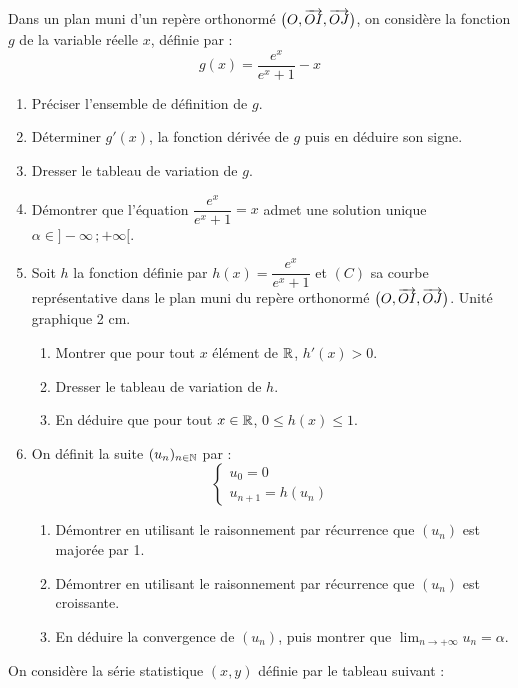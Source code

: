 \documentclass[11pt]{article}
\begin{document}

Dans un plan muni d'un repère orthonormé $\big(O,\overrightarrow{OI},\overrightarrow{OJ}\big)$, on considère la fonction $g$ de la variable réelle $x$, définie par :
\[ g(x) = \frac{e^x}{e^x + 1} - x \]

\begin{enumerate}
  \item Préciser l'ensemble de définition de $g$.
  \item Déterminer $g'(x)$, la fonction dérivée de $g$ puis en déduire son signe.
  \item Dresser le tableau de variation de $g$.
  \item Démontrer que l'équation $\dfrac{e^x}{e^x + 1} = x$ admet une solution unique $\alpha \in ]-\infty\,;+\infty[$.
  \item Soit $h$ la fonction définie par $h(x) = \dfrac{e^x}{e^x + 1}$ et $(C)$ sa courbe représentative dans le plan muni du repère orthonormé $\big(O,\overrightarrow{OI},\overrightarrow{OJ}\big)$. Unité graphique 2 cm.
  \begin{enumerate}[label=\alph*.]
    \item Montrer que pour tout $x$ élément de $\mathbb{R}$, $h'(x) > 0$.
    \item Dresser le tableau de variation de $h$.
    \item En déduire que pour tout $x \in \mathbb{R}$, $0 \le h(x) \le 1$.
  \end{enumerate}
  \item On définit la suite $(u_n)_{n\in\mathbb{N}}$ par :
  \[ \begin{cases} u_0 = 0 \\ u_{n+1} = h(u_n) \end{cases} \]
  \begin{enumerate}[label=\alph*.]
    \item Démontrer en utilisant le raisonnement par récurrence que $(u_n)$ est majorée par 1.
    \item Démontrer en utilisant le raisonnement par récurrence que $(u_n)$ est croissante.
    \item En déduire la convergence de $(u_n)$, puis montrer que $\displaystyle\lim_{n\to+\infty} u_n = \alpha$.
  \end{enumerate}
\end{enumerate}


On considère la série statistique $(x, y)$ définie par le tableau suivant :
\end{document}
